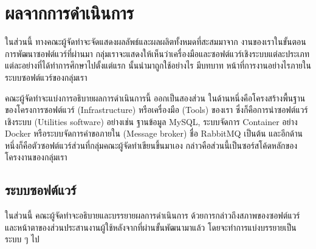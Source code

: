 \documentclass[12pt,one side,openright,a4paper]{cpe-thesis-th}
\newcommand{\thaijustify}[1]{%
  \par\hspace{30pt}\justifying
  #1
}
\begin{document}
\section{ผลจากการดำเนินการ}
\thaijustify{
  ในส่วนนี้ ทางคณะผู้จัดทำจะจัดแสดงผลลัพธ์และผลผลิตทั้งหมดที่สะสมมาจาก งานของเราในขั้นตอนการพัฒนาซอฟต์แวร์ที่ผ่านมา กลุ่มเราจะแสดงให้เห็นว่าเครื่องมือและซอฟต์แวร์เชิงระบบแต่ละประเภท แต่ละอย่างที่ได้ทำการศึกษาไปตั้งแต่แรก นั้นนำมาถูกใช้อย่างไร มีบทบาท หน้าที่การงานอย่างไรภายในระบบซอฟต์แวร์ของกลุ่มเรา
}
\thaijustify{
  คณะผู้จัดทำจะแบ่งการอธิบายผลการดำเนินการนี้ ออกเป็นสองส่วน ในด้านหนึ่งคือโครงสร้างพื้นฐานของโครงการซอฟต์แวร์ (Infrastructure) หรือเครื่องมือ (Tools) ของเรา ซึ่งก็คือการนำซอฟต์แวร์เชิงระบบ (Utilities software) อย่างเช่น ฐานข้อมูล MySQL, ระบบจัดการ Container อย่าง Docker หรือระบบจัดการคำขอภายใน (Message broker) ชื่อ RabbitMQ เป็นต้น และอีกด้านหนึ่งก็คือตัวซอฟต์แวร์ส่วนที่กลุ่มคณะผู้จัดทำเขียนขึ้นมาเอง กล่าวคือส่วนนี้เป็นซอร์สโค้ดหลักของโครงงานของกลุ่มเรา
}
\subsection{ระบบซอฟต์แวร์}
ในส่วนนี้ คณะผู้จัดทำจะอธิบายและบรรยายผลการดำเนินการ ด้วยการกล่าวถึงสภาพของซอฟต์แวร์ และหน้าตาของส่วนประสานงานผู้ใช้หลังจากที่ผ่านขั้นพัฒนามาแล้ว โดยจะทำการแบ่งบรรยายเป็นระบบ ๆ ไป
\end{document}
